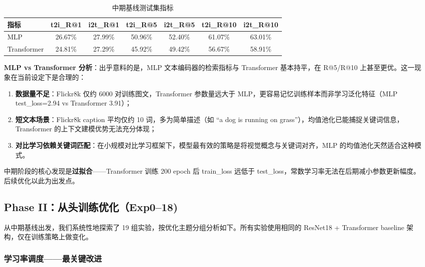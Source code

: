 \documentclass[12pt,a4paper]{article}
\begin{document}
\begin{table}[H]
\centering
\caption{中期基线测试集指标}
\begin{tabular}{lcccccc}
\toprule
\textbf{指标} & \textbf{t2i\_R@1} & \textbf{i2t\_R@1} & \textbf{t2i\_R@5} & \textbf{i2t\_R@5} & \textbf{t2i\_R@10} & \textbf{i2t\_R@10} \\
\midrule
MLP & 26.67\% & 27.99\% & 50.96\% & 52.40\% & 61.07\% & 63.01\% \\
Transformer & 24.81\% & 27.29\% & 45.92\% & 49.42\% & 56.67\% & 58.91\% \\
\bottomrule
\end{tabular}
\end{table}

\noindent \textbf{MLP vs Transformer 分析}：出乎意料的是，MLP 文本编码器的检索指标与 Transformer 基本持平，在 R@5/R@10 上甚至更优。这一现象在当前设定下是合理的：

\begin{enumerate}[nosep]
    \item \textbf{数据量不足}：Flickr8k 仅约 6000 对训练图文，Transformer 参数量远大于 MLP，更容易记忆训练样本而非学习泛化特征（MLP test\_loss=2.94 vs Transformer 3.91）；
    \item \textbf{短文本场景}：Flickr8k caption 平均仅约 10 词，多为简单描述（如 ``a dog is running on grass''），均值池化已能捕捉关键词信息，Transformer 的上下文建模优势无法充分体现；
    \item \textbf{对比学习依赖关键词匹配}：在小规模对比学习框架下，模型最有效的策略是将视觉概念与关键词对齐，MLP 的均值池化天然适合这种模式。
\end{enumerate}

\noindent 中期阶段的核心发现是\textbf{过拟合}——Transformer 训练 200 epoch 后 train\_loss 远低于 test\_loss，常数学习率无法在后期减小参数更新幅度。后续优化以此为出发点。

\subsection{Phase II：从头训练优化（Exp0--18)}

从中期基线出发，我们系统性地探索了 19 组实验，按优化主题分组分析如下。所有实验使用相同的 ResNet18 + Transformer baseline 架构，仅在训练策略上做变化。

\subsubsection{学习率调度——最关键改进}
\end{document}
